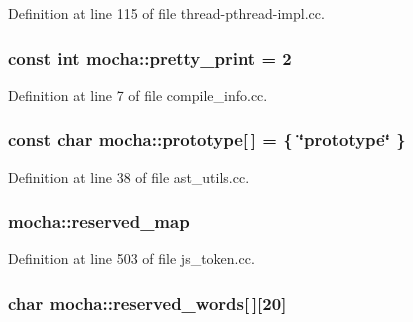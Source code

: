 Definition at line 115 of file thread-\/pthread-\/impl.cc.

\hypertarget{namespacemocha_a0a9e708642adfe9936eab588e538966a}{
\subsubsection[{pretty\_\-print}]{\setlength{\rightskip}{0pt plus 5cm}const int {\bf mocha::pretty\_\-print} = 2}}
\label{namespacemocha_a0a9e708642adfe9936eab588e538966a}


Definition at line 7 of file compile\_\-info.cc.

\hypertarget{namespacemocha_adf5b9fa11b01461bf5f1aca4f93c29bd}{
\subsubsection[{prototype}]{\setlength{\rightskip}{0pt plus 5cm}const char {\bf mocha::prototype}\mbox{[}$\,$\mbox{]} = \{ \char`\"{}prototype\char`\"{} \}}}
\label{namespacemocha_adf5b9fa11b01461bf5f1aca4f93c29bd}


Definition at line 38 of file ast\_\-utils.cc.

\hypertarget{namespacemocha_a9722600d13953bf4046df586b937cdf5}{
\subsubsection[{reserved\_\-map}]{ {\bf mocha::reserved\_\-map}}}
\label{namespacemocha_a9722600d13953bf4046df586b937cdf5}


Definition at line 503 of file js\_\-token.cc.

\hypertarget{namespacemocha_ad9756329f84e84742450210ab26bb610}{
\subsubsection[{reserved\_\-words}]{\setlength{\rightskip}{0pt plus 5cm}char {\bf mocha::reserved\_\-words}\mbox{[}$\,$\mbox{]}\mbox{[}20\mbox{]}}}
\label{namespacemocha_ad9756329f84e84742450210ab26bb610}


